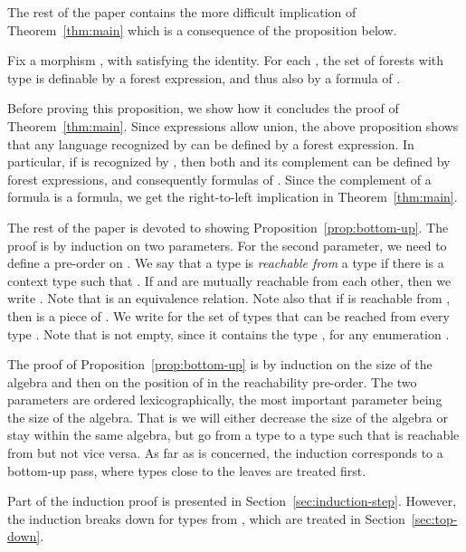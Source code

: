 \documentclass{LMCS}
\begin{document}
The rest of the paper contains the more difficult implication of
Theorem~\ref{thm:main} which is a consequence of the proposition below.

\begin{prop}\label{prop:bottom-up}
  Fix a morphism , with 
  satisfying the  identity.  For each , the set 
   of forests  with type  is definable by a  forest
  expression, and thus also by a formula of \Stwol.
\end{prop}


Before proving this proposition, we show how it concludes the proof of
Theorem~\ref{thm:main}.  Since  expressions allow union, the
above proposition shows that any language recognized by  can
be defined by a  forest expression. In particular, if  is
recognized by , then both  and its complement can be
defined by  forest expressions, and consequently formulas of
\Stwol.  Since the complement of a \Stwol formula is a \Ptwol
formula, we get the right-to-left implication in
Theorem~\ref{thm:main}.

The rest of the paper is devoted to showing
Proposition~\ref{prop:bottom-up}. The proof is by induction on two
parameters.  For the second parameter, we need to define a pre-order on . We say that a type  is
\emph{reachable from} a type  if there is a context type  such
that . If  and  are mutually reachable from each other,
then we write . Note that  is an equivalence relation.
Note also that if  is reachable from , then  is a piece of
. We write  for the set of types  that can be reached
from every type . Note that  is not empty, since it
contains the type , for any enumeration
. 




The proof of Proposition~\ref{prop:bottom-up} is by induction on the
size of the algebra  and then on the position of  in the
reachability pre-order. The two parameters are ordered
lexicographically, the most important parameter being the size of the
algebra. That is we will either decrease the size of the algebra or
stay within the same algebra, but go from a type  to a type 
such that  is reachable from  but not vice versa. As far as 
is concerned, the induction corresponds to a bottom-up pass, where
types close to the leaves are treated first.




Part of the  induction proof is presented in Section~\ref{sec:induction-step}.
However, the induction breaks down for types from , which are
treated in Section~\ref{sec:top-down}.
\end{document}

